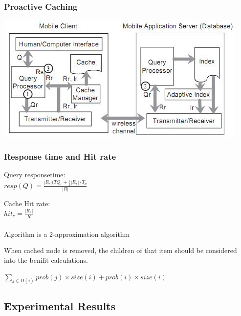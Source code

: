 \begin{frame}
\frametitle{Proactive Caching}

\begin{center}
\includegraphics[scale=0.80]{images/proactive-caching.jpg}
\end{center}

\end{frame}

\begin{frame}
\frametitle{Response time and Hit rate}

Query responsetime:\\
$resp(Q)=\frac{|R_r|(T{Q_{r}}+\frac{1}{2}|R_r|\cdot T_d}{|R|}$
\vspace{1.5em}

Cache Hit rate:\\
$hit_c = \frac{|R_s|}{R}$
\end{frame}


\begin{frame}
\frametitle{}

Algorithm is a 2-approximation algorithm

When cached node is removed, the children of that item should be considered into the benifit calculations.

$\sum_{j \in D(i)}{prob(j)\times size(i)+ prob(i)\times size(i)}$


\end{frame}



\subsection{Experimental Results}
%
%
%
%
%
%
%
%
%
%

